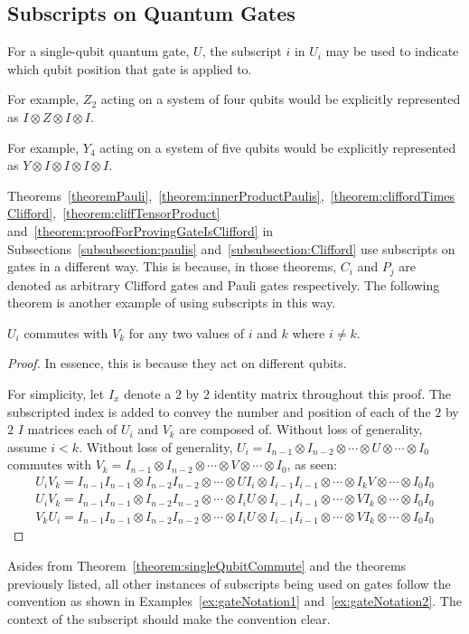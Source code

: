\subsection{Subscripts on Quantum Gates}
For a single-qubit quantum gate, $U$, the subscript $i$ in $U_i$ may be used to indicate which qubit position that gate is applied to. 
\begin{example}
\label{ex:gateNotation1}
For example, $Z_2$ acting on a system of four qubits would be explicitly represented as $I \otimes Z \otimes I \otimes I$.
\end{example}
\begin{example}
\label{ex:gateNotation2}
For example, $Y_4$ acting on a system of five qubits would be explicitly represented as $Y \otimes I \otimes I \otimes I \otimes I$.
\end{example}

Theorems~\ref{theoremPauli},~\ref{theorem:innerProductPaulis},~\ref{theorem:cliffordTimesClifford},~\ref{theorem:cliffTensorProduct} and~\ref{theorem:proofForProvingGateIsClifford} in Subsections~\ref{subsubsection:paulis} and~\ref{subsubsection:Clifford} use subscripts on gates in a different way. This is because, in those theorems, $C_i$ and $P_j$ are denoted as arbitrary Clifford gates and Pauli gates respectively. The following theorem is another example of using subscripts in this way.
\begin{theorem}
\label{theorem:singleQubitCommute}
$U_i$ commutes with $V_k$ for any two values of $i$ and $k$ where $i \neq k$.
\end{theorem}
\begin{proof}
In essence, this is because they act on different qubits.

For simplicity, let $I_x$ denote a $2$ by $2$ identity matrix throughout this proof. The subscripted index is added to convey the number and position of each of the $2$ by $2$ $I$ matrices each of $U_i$ and $V_k$ are composed of. Without loss of generality, assume $i < k$. Without loss of generality, $U_i = I_{n-1} \otimes I_{n-2} \otimes \cdots \otimes U \otimes \cdots \otimes I_0$ commutes with $V_k = I_{n-1} \otimes I_{n-2} \otimes \cdots \otimes V \otimes \cdots \otimes I_0$, as seen:
\begin{align}
U_iV_k = I_{n-1}I_{n-1} \otimes I_{n-2}I_{n-2} \otimes \cdots \otimes UI_i \otimes I_{i-1}I_{i-1} \otimes \cdots \otimes I_kV \otimes \cdots \otimes I_0I_0\\
U_iV_k = I_{n-1}I_{n-1} \otimes I_{n-2}I_{n-2} \otimes \cdots \otimes I_iU \otimes I_{i-1}I_{i-1} \otimes \cdots \otimes VI_k \otimes \cdots \otimes I_0I_0\\
V_kU_i = I_{n-1}I_{n-1} \otimes I_{n-2}I_{n-2} \otimes \cdots \otimes I_iU \otimes I_{i-1}I_{i-1} \otimes \cdots \otimes VI_k \otimes \cdots \otimes I_0I_0
\end{align}
\end{proof}
Asides from Theorem~\ref{theorem:singleQubitCommute} and the theorems previously listed, all other instances of subscripts being used on gates follow the convention as shown in Examples~\ref{ex:gateNotation1} and~\ref{ex:gateNotation2}. The context of the subscript should make the convention clear.

